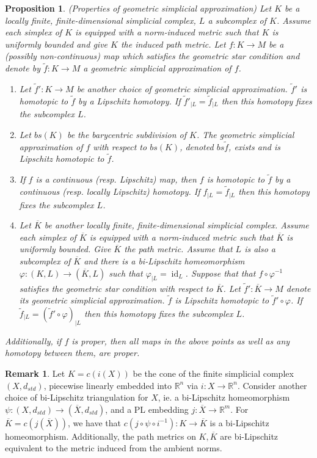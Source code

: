 \documentclass[a4paper,11pt]{article}
\theoremstyle{definition}
\newtheorem*{remark}{Remark}
\theoremstyle{plain}
\newtheorem{prop}[definition]{Proposition}
\theoremstyle{remark}
\DeclareMathOperator{\id}{id}
\begin{document}
{\begin{prop} (Properties of geometric simplicial approximation) \label{geosa} Let $K$ be a locally finite, finite-dimensional simplicial complex, $L$ a subcomplex of $K$. Assume each simplex of $K$ is equipped with a norm-induced metric such that $K$ is uniformly bounded and give $K$ the induced path metric. Let $f:K\rightarrow M$ be a (possibly non-continuous) map which satisfies the geometric star condition and denote by $\tilde{f}:K\rightarrow M$ a geometric simplicial approximation of $f$. 
\begin{enumerate}
\item Let $\tilde{f}':K\rightarrow M$ be another choice of geometric simplicial approximation. $\tilde{f}'$ is homotopic to $\tilde{f}$ by a Lipschitz homotopy. If $\tilde{f}'_{|L} = \tilde{f}_{|L}$ then this homotopy fixes the subcomplex $L$. 
\item Let $bs(K)$ be the barycentric subdivision of $K$. The geometric simplicial approximation of $f$ with respect to $bs(K)$, denoted $bs\tilde{f}$, exists and is Lipschitz homotopic to $\tilde{f}$. 
\item If $f$ is a continuous (resp. Lipschitz) map, then $f$ is homotopic to $\tilde{f}$ by a continuous (resp. locally Lipschitz) homotopy. If $f_{|L} = \tilde{f}_{|L}$ then this homotopy fixes the subcomplex $L$. 
\item Let $\overline{K}$ be another locally finite, finite-dimensional simplicial complex. Assume each simplex of $\overline{K}$ is equipped with a norm-induced metric such that $\overline{K}$ is uniformly bounded. Give $\overline{K}$ the path metric. Assume that $L$ is also a subcomplex of $\overline{K}$ and there is a bi-Lipschitz homeomorphism $\varphi: (K,L)\rightarrow (\overline{K},L)$ such that $\varphi_{|L}=\id_{L}$. Suppose that that $f\circ \varphi^{-1}$ satisfies the geometric star condition with respect to $\overline{K}$. Let $\tilde{f}': \overline{K}\rightarrow M$ denote its geometric simplicial approximation. $\tilde{f}$ is Lipschitz homotopic to $\tilde{f}'\circ \varphi$. If $\tilde{f}_{|L} = (\tilde{f}'\circ \varphi)_{|L}$ then this homotopy fixes the subcomplex $L$.  

\end{enumerate}
Additionally, if $f$ is proper, then all maps in the above points as well as any homotopy between them, are proper. 
\end{prop}


\begin{remark} Let $K= c(i(X))$ be the cone of the finite simplicial complex $(X,d_{std})$, piecewise linearly embedded into $\mathbb{R}^n$ via $i: X\rightarrow \mathbb{R}^n$. Consider another choice of bi-Lipschitz triangulation for $X$, ie. a bi-Lipschitz homeomorphism $\psi: (X,d_{std})\rightarrow (\overline{X},d_{std})$, and a PL embedding $j: \overline{X}\rightarrow \mathbb{R}^m$. For $\overline{K}= c(j(\overline{X}))$, we have that $c(j\circ \psi \circ i^{-1}): K \rightarrow \overline{K}$ is a bi-Lipschitz homeomorphism. Additionally, the path metrics on $K,\overline{K}$ are bi-Lipschitz equivalent to the metric induced from the ambient norms. 
\end{remark}

}
\end{document}
